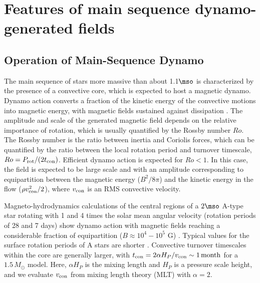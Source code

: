 \section{Features of main sequence dynamo-generated fields}

\subsection{Operation of Main-Sequence Dynamo}

The main sequence of stars more massive than about 1.1$\mso$ is characterized by the presence of a convective core,
which is expected to host a magnetic dynamo. Dynamo action converts a fraction of the kinetic energy 
of the convective motions into magnetic energy, with magnetic fields sustained against dissipation  \citep[see e.g.,][]{Brandenburg_2005}. The amplitude and scale of the generated magnetic field depends on the relative importance of rotation, which is usually quantified by the Rossby number $Ro$. The Rossby number is the ratio between inertia and Coriolis forces, which can be quantified by the ratio between the local rotation period and turnover timescale, $Ro = P_{\rm rot}/(2 t_{\rm con})$. 
Efficient dynamo action is expected for $Ro<1$. In this case, the field is expected to be large scale and with an amplitude corresponding to equipartition between the magnetic energy ($B^2/8\pi$) and the kinetic energy in the flow ($\rho v^2_{\rm con}/2$), where $v_{\rm con}$ is an RMS convective velocity.

Magneto-hydrodynamics calculations of the central regions of a $2\mso$ A-type star rotating with 
1 and 4 times the solar mean angular velocity (rotation periods of 28 and 7 days) show dynamo action 
with magnetic fields reaching a considerable fraction of equipartition ($B \approx 10^4-10^5$ G) \citep{Brun_2005}. Typical values for the surface  rotation periods of A stars are shorter \citep[about 1 day, see e.g.]{Zorec_2012}. Convective turnover timescales within the core are generally larger, with $t_{\rm con} = 2 \alpha H_P/v_{\rm con} \sim 1 \, {\rm month}$ for a $1.5 \, M_\odot$ model. Here, $\alpha H_P$ is the mixing length and $H_P$ is a pressure scale height, and we evaluate $v_{\rm con}$ from mixing length theory (MLT) with $\alpha = 2$. 

